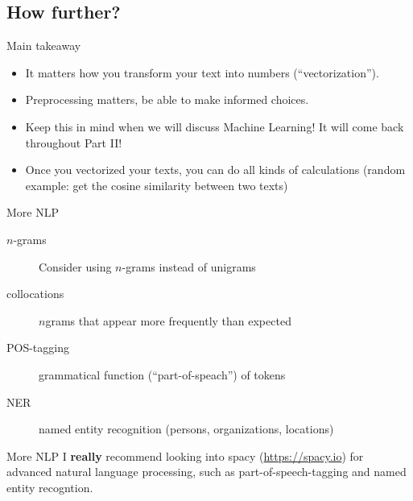 \subsection{How further?}


\begin{frame}{Main takeaway}

\begin{itemize}
	\item It matters how you transform your text into numbers (``vectorization'').
	\item Preprocessing matters, be able to make informed choices.
	\item Keep this in mind when we will discuss Machine Learning! It will come back throughout Part II!
\end{itemize}

\begin{itemize}
	\item Once you vectorized your texts, you can do all kinds of calculations (random example: get the cosine similarity between two texts)
\end{itemize}

\end{frame}


\begin{frame}{More NLP}
\begin{description}
	\item[$n$-grams] Consider using $n$-grams instead of unigrams
	\item[collocations]  $n$grams that appear more frequently than expected
	\item[POS-tagging] grammatical function (``part-of-speach'') of tokens
	\item[NER] named entity recognition (persons, organizations, locations)
\end{description}
\end{frame}

\begin{frame}{More NLP}
I \textbf{really} recommend looking into spacy (\url{https://spacy.io}) for advanced natural language processing, such as part-of-speech-tagging and named entity recogntion.
\end{frame}


